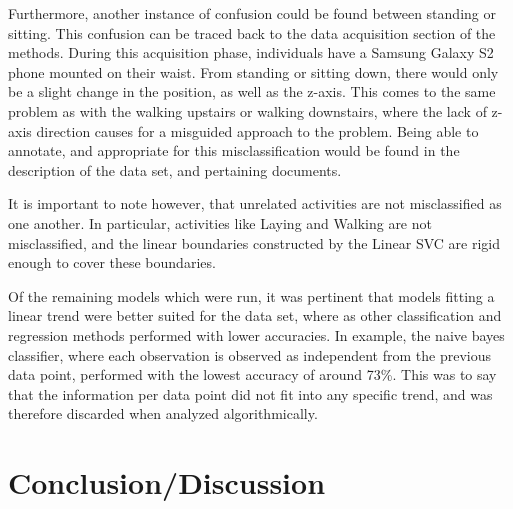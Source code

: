 \documentclass[12pt]{article}
\begin{document}
	Furthermore, another instance of confusion could be found between standing or sitting. This confusion can be traced back to the data acquisition section of the methods. During this acquisition phase, individuals have a Samsung Galaxy S2 phone mounted on their waist. From standing or sitting down, there would only be a slight change in the position, as well as the z-axis. This comes to the same problem as with the walking upstairs or walking downstairs, where the lack of z-axis direction causes for a misguided approach to the problem. Being able to annotate, and appropriate for this misclassification would be found in the description of the data set, and pertaining documents. 
	
	It is important to note however, that unrelated activities are not misclassified as one another. In particular, activities like Laying and Walking are not misclassified, and the linear boundaries constructed by the Linear SVC are rigid enough to cover these boundaries. 
	
	Of the remaining models which were run, it was pertinent that models fitting a linear trend were better suited for the data set, where as other classification and regression methods performed with lower accuracies. In example, the naive bayes classifier, where each observation is observed as independent from the previous data point, performed with the lowest accuracy of around 73\%. This was to say that the information per data point did not fit into any specific trend, and was therefore discarded when analyzed algorithmically. 

\section{Conclusion/Discussion}
\end{document}
